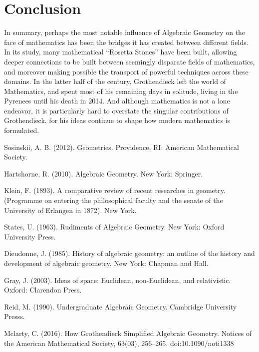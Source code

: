 \documentclass{article}
\theoremstyle{definition}
\begin{document}
\section{Conclusion}

In summary, perhaps the most notable influence of Algebraic Geometry on
the face of mathematics has been the bridges it has created between
different fields. In its study, many mathematical ``Rosetta Stones'' have
been built, allowing deeper connections to be built between seemingly disparate
fields of mathematics, and moreover making possible the transport of
powerful techniques across these domains. In the latter half
of the  century, Grothendieck left the world of Mathematics,
and spent most of his remaining days in solitude, living in the Pyrenees until his death in 2014. And although mathematics is not a lone
endeavor, it is particularly hard to overstate the singular
contributions of Grothendieck, for his ideas continue to shape how modern mathematics is formulated.

\newpage

\begin{thebibliography}{20}

Sosinskii, A. B. (2012). Geometries. Providence, RI: American Mathematical Society.

Hartshorne, R. (2010). Algebraic Geometry. New York: Springer.

Klein, F. (1893). A comparative review of recent researches in geometry. (Programme on entering the philosophical faculty and the senate of the University of Erlangen in 1872). New York.

States, U. (1963). Rudiments of Algebraic Geometry. New York: Oxford University Press.

Dieudonne, J. (1985). History of algebraic geometry: an outline of the history and development of algebraic geometry. New York: Chapman and Hall.

Gray, J. (2003). Ideas of space: Euclidean, non-Euclidean, and relativistic. Oxford: Clarendon Press.

Reid, M. (1990). Undergraduate Algebraic Geometry. Cambridge University Presss.

Mclarty, C. (2016). How Grothendieck Simplified Algebraic Geometry. Notices of the American Mathematical Society, 63(03), 256–265. doi:10.1090/noti1338

\end{thebibliography}
\end{document}
